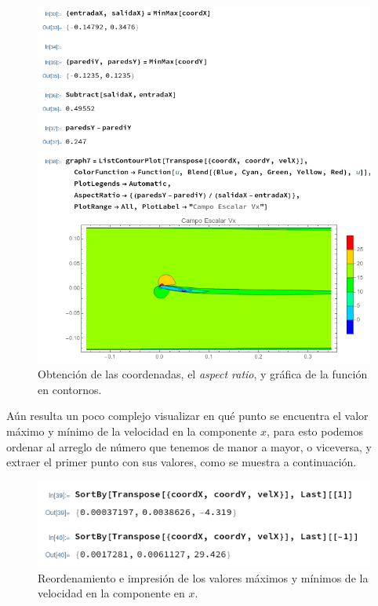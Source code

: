 \documentclass[12pt, letterpaper]{article}
\begin{document}
\begin{figure}[H]
	\centering
	\includegraphics[width=\textwidth]{10.png}
	\caption{Obtención de las coordenadas, el \textit{aspect ratio}, y gráfica de la función en contornos.}
\end{figure}

Aún resulta un poco complejo visualizar en qué punto se encuentra el valor máximo y mínimo de la velocidad en la componente $x$, para esto podemos ordenar al arreglo de número que tenemos de manor a mayor, o viceversa, y extraer el primer punto con sus valores, como se muestra a continuación.

\begin{figure}[H]
	\centering
	\includegraphics[width=\textwidth]{11.png}
	\caption{Reordenamiento e impresión de los valores máximos y mínimos de la velocidad en la  componente en $x$.}
\end{figure}
\end{document}
